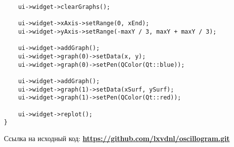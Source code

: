 \begin{enumerate}
\begin{lstlisting}
    ui->widget->clearGraphs();

    ui->widget->xAxis->setRange(0, xEnd);
    ui->widget->yAxis->setRange(-maxY / 3, maxY + maxY / 3);

    ui->widget->addGraph();
    ui->widget->graph(0)->setData(x, y);
    ui->widget->graph(0)->setPen(QColor(Qt::blue));

    ui->widget->addGraph();
    ui->widget->graph(1)->setData(xSurf, ySurf);
    ui->widget->graph(1)->setPen(QColor(Qt::red));

    ui->widget->replot();
}
\end{lstlisting}

\end{enumerate}

{\Large
Ссылка на исходный код:
}
{\large
\textbf{\textcolor{blue}{{\href{https://github.com/lxvdnl/oscillogram.git}{https://github.com/lxvdnl/oscillogram.git}}}}
}